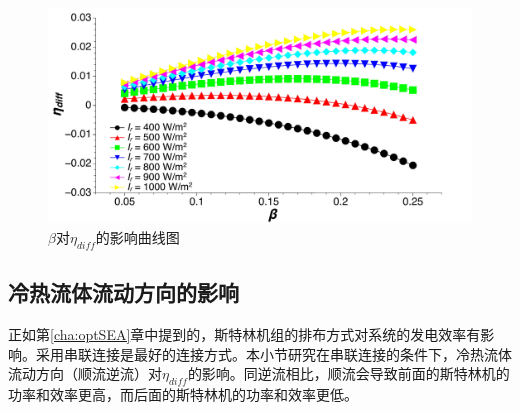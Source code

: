 \noindent \begin{figure}[H]
\begin{center}
	\includegraphics[width = 0.8\columnwidth, angle = 0]{fig/beta-eta_diff}
	\caption{$\beta$对$\eta_{diff}$的影响曲线图}
	\label{fig:beta-eta_diff}
\end{center}
\end{figure}

\subsection{冷热流体流动方向的影响}

正如第\ref{cha:optSEA}章中提到的，斯特林机组的排布方式对系统的发电效率有影响。采用串联连接是最好的连接方式。本小节研究在串联连接的条件下，冷热流体流动方向（顺流逆流）对$\eta_{diff}$的影响。同逆流相比，顺流会导致前面的斯特林机的功率和效率更高，而后面的斯特林机的功率和效率更低。

